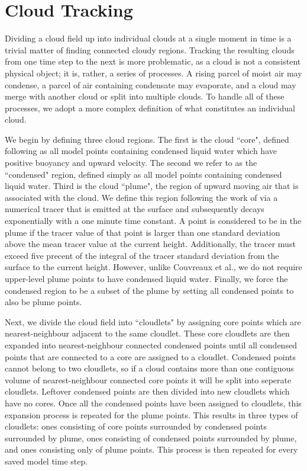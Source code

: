 \documentclass[acp]{copernicus}
\begin{document}
\section{Cloud Tracking}

Dividing a cloud field up into individual clouds at a single moment in time is 
a trivial matter of finding connected cloudy regions.  Tracking the resulting 
clouds from one time step to the next is more problematic, as a cloud is not a 
consistent physical object; it is, rather, a series of processes.  A rising 
parcel of moist air may condense, a parcel of air containing condensate may 
evaporate, and a cloud may merge with another cloud or split into multiple 
clouds.  To handle all of these processes, we adopt a more complex definition 
of what constitutes an individual cloud.

We begin by defining three cloud regions.  The first is the cloud ``core", 
defined following \cite{Siebesma1995} as all model points containing condensed 
liquid water which have positive buoyancy and upward velocity.  The second we 
refer to as the ``condensed" region, defined simply as all model points 
containing condensed liquid water.  Third is the cloud ``plume", the region of 
upward moving air that is associated with the cloud.  We define this region 
following the work of \cite{Couvreaux2010} via a numerical tracer that is 
emitted at the surface and subsequently decays exponentially with a one minute 
time constant.  A point is considered to be in the plume if the tracer value of 
that point is larger than one standard deviation above the mean tracer value at 
the current height.  Additionally, the tracer must exceed five precent of the 
integral of the tracer standard deviation from the surface to the current 
height.  However, unlike Couvreaux et al., we do not require upper-level plume 
points to have condensed liquid water.  Finally, we force the condensed region 
to be a subset of the plume by setting all condensed points to also be plume 
points.

Next, we divide the cloud field into ``cloudlets" by assigning core points 
which are nearest-neighbour adjacent to the same cloudlet.  These core 
cloudlets are then expanded into nearest-neighbour connected condensed points 
until all condensed points that are connected to a core are assigned to a 
cloudlet.  Condensed points cannot belong to two cloudlets, so if a cloud 
contains more than one contiguous volume of nearest-neighbour connected core 
points it will be split into seperate cloudlets.  Leftover condensed points are 
then divided into new cloudlets which have no cores.  Once all the condensed 
points have been assigned to cloudlets, this expansion process is repeated for 
the plume points.  This results in three types of cloudlets: ones consisting of 
core points surrounded by condensed points surrounded by plume, ones consisting 
of condensed points surrounded by plume, and ones consisting only of plume 
points.  This process is then repeated for every saved model time step.
\end{document}

